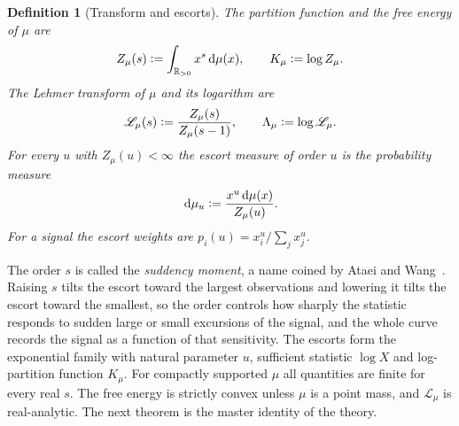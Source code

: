 \documentclass[sn-mathphys-num]{sn-jnl}\newcommand{\SNJNL}{}
\theoremstyle{thmstyleone}
\theoremstyle{thmstyletwo}
\theoremstyle{thmstylethree}
\newtheorem{definition}{Definition}
\theoremstyle{thmstyleone}
\providecommand{\Rpos}{\mathbb{R}_{>0}}
\providecommand{\Leh}{\mathscr{L}}
\providecommand{\dd}{\,\mathrm{d}}
\providecommand{\eqdef}{\mathrel{\vcentcolon=}}
\begin{document}
	\begin{definition}[Transform and escorts]\label{def:Z}
		The \emph{partition function} and the \emph{free energy} of $\mu$
		are
		\begin{equation}\label{eq:defZ}
			Z_\mu(s)\eqdef\int_{\Rpos}x^{s}\dd\mu(x),
			\qquad
			K_\mu\eqdef\log Z_\mu .
		\end{equation}
		The \emph{Lehmer transform} of $\mu$ and its logarithm are
		\begin{equation}\label{eq:defL}
			\Leh_\mu(s)\eqdef\frac{Z_\mu(s)}{Z_\mu(s-1)},
			\qquad
			\Lambda_\mu\eqdef\log\Leh_\mu .
		\end{equation}
		For every $u$ with $Z_\mu(u)<\infty$ the \emph{escort measure} of
		order $u$ is the probability measure
		\begin{equation}\label{eq:escort}
			\dd\mu_u\eqdef\frac{x^{u}\dd\mu(x)}{Z_\mu(u)} .
		\end{equation}
		For a signal the escort weights are $p_i(u)=x_i^{u}/\sum_jx_j^{u}$.
	\end{definition}
	
	The order $s$ is called the \emph{suddency moment}, a name coined
	by Ataei and Wang~\cite{ataei2022}. Raising $s$ tilts the escort
	toward the largest observations and lowering it tilts the escort
	toward the smallest, so the order controls how sharply the statistic
	responds to sudden large or small excursions of the signal, and the
	whole curve records the signal as a function of that sensitivity.
	The escorts form the exponential family with natural parameter $u$,
	sufficient statistic $\log X$ and log-partition function $K_\mu$.
	For compactly supported $\mu$ all quantities are finite for every
	real $s$. The free energy is strictly convex unless $\mu$ is a point
	mass, and $\Leh_\mu$ is real-analytic. The next theorem is the
	master identity of the theory.
	
\end{document}
